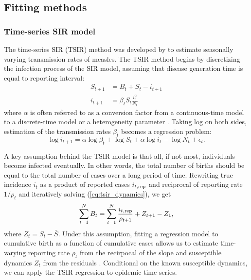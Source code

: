 \documentclass{article}
\newcommand{\eref}[1]{(\ref{eq:#1})}
\begin{document}
\subsection{Fitting methods}

\subsubsection*{Time-series SIR model}

The time-series SIR (TSIR) method was developed by \cite{bjornstad2002dynamics} to estimate seasonally varying transmission rates of measles.
The TSIR method begins by discretizing the infection process of the SIR model, assuming that disease generation time is equal to reporting interval:
\begin{equation}\label{eq:tsir_dynamics}
\begin{aligned}
S_{t+1} &= B_t + S_t - i_{t+1}\\
i_{t+1} &= \beta_t S_t \frac{i_t^\alpha}{N_t}
\end{aligned}
\end{equation}
where $\alpha$ is often referred to as a conversion factor from a continuous-time model to a discrete-time model or a heterogeneity parameter \citep{glass2003interpreting}.
Taking log on both sides, estimation of the transmission rates $\beta_t$ becomes a regression problem:
\begin{equation}\label{eq:tsir}
\log i_{t + 1} = \alpha \log \beta_t + \log S_t + \alpha \log i_t - \log N_t + \epsilon_t.
\end{equation}

A key assumption behind the TSIR model is that all, if not most, individuals become infected eventually.
In other words, the total number of births should be equal to the total number of cases over a long period of time.
Rewriting true incidence $i_t$ as a product of reported cases $i_{t, {\tiny \textrm{rep}}}$ and reciprocal of reporting rate $1/\rho_t$ and iteratively solving \eref{tsir_dynamics}, we get
\begin{equation}
\sum_{t=1}^N B_t = \sum_{t=1}^N \frac{i_{t, {\tiny \textrm{rep}}}}{\rho_{t+1}} + Z_{t+1} - Z_1,
\end{equation}
where $Z_t = S_t - \bar{S}$.
Under this assumption, fitting a regression model to cumulative birth as a function of cumulative cases allows us to estimate time-varying reporting rate $\rho_t$ from the recirpocal of the slope and susceptible dynamics $Z_t$ from the residuals \citep{finkenstadt2000time}.
Conditional on the known susceptible dynamics, we can apply the TSIR regression \label{eq:tsir} to epidemic time series.
\end{document}
